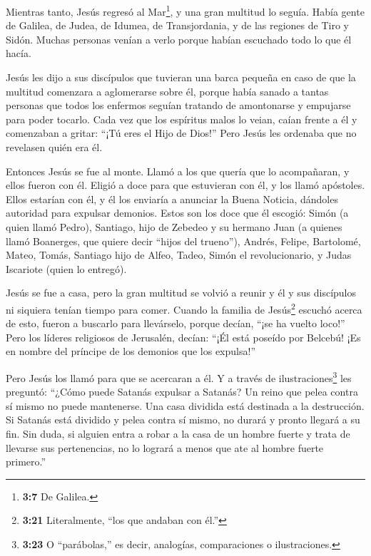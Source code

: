  Mientras tanto, Jesús regresó al Mar\footnote{\textbf{3:7}
  De Galilea.}, y una gran multitud lo seguía. Había gente de Galilea,
 de Judea, de Idumea, de Transjordania, y de las regiones de
Tiro y Sidón. Muchas personas venían a verlo porque habían escuchado
todo lo que él hacía.

 Jesús les dijo a sus discípulos que tuvieran una barca
pequeña en caso de que la multitud comenzara a aglomerarse sobre él,
 porque había sanado a tantas personas que todos los
enfermos seguían tratando de amontonarse y empujarse para poder tocarlo.
 Cada vez que los espíritus malos lo veian, caían frente a
él y comenzaban a gritar: ``¡Tú eres el Hijo de Dios!'' 
Pero Jesús les ordenaba que no revelasen quién era él.

 Entonces Jesús se fue al monte. Llamó a los que quería que
lo acompañaran, y ellos fueron con él.  Eligió a doce para
que estuvieran con él, y los llamó apóstoles. Ellos estarían con él, y
él los enviaría a anunciar la Buena Noticia,  dándoles
autoridad para expulsar demonios.  Estos son los doce que
él escogió: Simón (a quien llamó Pedro),  Santiago, hijo de
Zebedeo y su hermano Juan (a quienes llamó Boanerges, que quiere decir
``hijos del trueno''),  Andrés, Felipe, Bartolomé, Mateo,
Tomás, Santiago hijo de Alfeo, Tadeo, Simón el revolucionario,
 y Judas Iscariote (quien lo entregó).

 Jesús se fue a casa, pero la gran multitud se volvió a
reunir y él y sus discípulos ni siquiera tenían tiempo para comer.
 Cuando la familia de Jesús\footnote{\textbf{3:21}
  Literalmente, ``los que andaban con él.''} escuchó acerca de esto,
fueron a buscarlo para llevárselo, porque decían, ``¡se ha vuelto
loco!''  Pero los líderes religiosos de Jerusalén, decían:
``¡Él está poseído por Belcebú! ¡Es en nombre del príncipe de los
demonios que los expulsa!''

 Pero Jesús los llamó para que se acercaran a él. Y a
través de ilustraciones\footnote{\textbf{3:23} O ``parábolas,'' es
  decir, analogías, comparaciones o ilustraciones.} les preguntó:
``¿Cómo puede Satanás expulsar a Satanás?  Un reino que
pelea contra sí mismo no puede mantenerse.  Una casa
dividida está destinada a la destrucción.  Si Satanás está
dividido y pelea contra sí mismo, no durará y pronto llegará a su fin.
 Sin duda, si alguien entra a robar a la casa de un hombre
fuerte y trata de llevarse sus pertenencias, no lo logrará a menos que
ate al hombre fuerte primero.''

